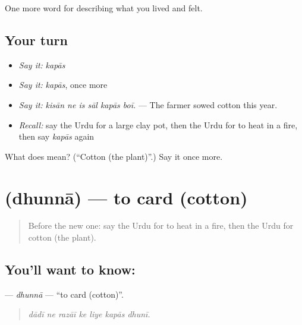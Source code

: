 \begin{grammarlens}[title={What you've built}]
One more word for describing what you lived and felt.
\end{grammarlens}

\subsection*{Your turn}
\begin{itemize}
\raggedright
  \item \emph{Say it:} \emph{kapās}
  \item \emph{Say it:} \emph{kapās}, once more
  \item \emph{Say it:} \emph{kisān ne is sāl kapās boī.} — The farmer sowed cotton this year.
  \item \emph{Recall:} say the Urdu for a large clay pot, then the Urdu for to heat in a fire, then say \emph{kapās} again
\end{itemize}

\begin{tcolorbox}[breakable,colback=teal!4,colframe=teal!35!black,title={Before you move on}]
What does  mean? (\textquotedblleft{}Cotton (the plant)\textquotedblright{}.) Say it once more.
\end{tcolorbox}
\section[\texorpdfstring{\ur{دھننا} (dhunnā)}{دھننا (dhunnā)}]{ (dhunnā) — to card (cotton)}

\label{lesson:UR-C499-dhunna}



\begin{quote}
Before the new one: say the Urdu for to heat in a fire, then the Urdu for cotton (the plant).
\end{quote}

\subsection*{You'll want to know: }
\textbf{} — \emph{dhunnā} — \textquotedblleft{}to card (cotton)\textquotedblright{}.

\begin{quote}
      
\end{quote}

\begin{quote}
\emph{dādī ne razāī ke liye kapās dhunī.}
\end{quote}

